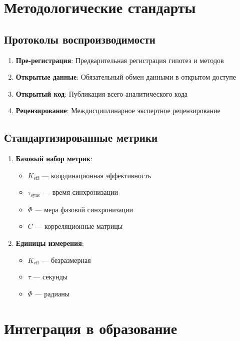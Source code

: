 \documentclass[12pt,a4paper]{article}
\begin{document}
	\section{Методологические стандарты}
	
	\subsection{Протоколы воспроизводимости}
	
	\begin{enumerate}
		\item \textbf{Пре-регистрация}: Предварительная регистрация гипотез и методов
		\item \textbf{Открытые данные}: Обязательный обмен данными в открытом доступе
		\item \textbf{Открытый код}: Публикация всего аналитического кода
		\item \textbf{Рецензирование}: Междисциплинарное экспертное рецензирование
	\end{enumerate}
	
	\subsection{Стандартизированные метрики}
	
	\begin{enumerate}
		\item \textbf{Базовый набор метрик}:
		\begin{itemize}
			\item $K_{\mathrm{eff}}$ — координационная эффективность
			\item $\tau_{\mathrm{sync}}$ — время синхронизации
			\item $\Phi$ — мера фазовой синхронизации
			\item $C$ — корреляционные матрицы
		\end{itemize}
		
		\item \textbf{Единицы измерения}:
		\begin{itemize}
			\item $K_{\mathrm{eff}}$ — безразмерная
			\item $\tau$ — секунды
			\item $\Phi$ — радианы
		\end{itemize}
	\end{enumerate}
	
	\section{Интеграция в образование}
	
\end{document}
